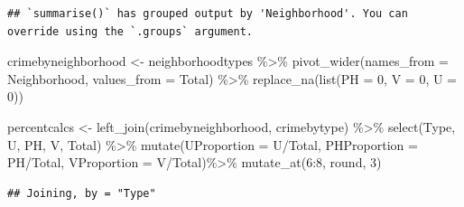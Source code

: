 \documentclass[
]{article}
\newenvironment{Shaded}{\begin{snugshade}}{\end{snugshade}}
\newcommand{\AttributeTok}[1]{\textcolor[rgb]{0.77,0.63,0.00}{#1}}
\newcommand{\DecValTok}[1]{\textcolor[rgb]{0.00,0.00,0.81}{#1}}
\newcommand{\FunctionTok}[1]{\textcolor[rgb]{0.00,0.00,0.00}{#1}}
\newcommand{\NormalTok}[1]{#1}
\newcommand{\OtherTok}[1]{\textcolor[rgb]{0.56,0.35,0.01}{#1}}
\newcommand{\SpecialCharTok}[1]{\textcolor[rgb]{0.00,0.00,0.00}{#1}}
\begin{document}
\begin{verbatim}
## `summarise()` has grouped output by 'Neighborhood'. You can override using the `.groups` argument.
\end{verbatim}

\begin{Shaded}
\begin{Highlighting}[]
\NormalTok{crimebyneighborhood }\OtherTok{\textless{}{-}}\NormalTok{ neighborhoodtypes }\SpecialCharTok{\%\textgreater{}\%}
  \FunctionTok{pivot\_wider}\NormalTok{(}\AttributeTok{names\_from =}\NormalTok{ Neighborhood, }\AttributeTok{values\_from =}\NormalTok{ Total) }\SpecialCharTok{\%\textgreater{}\%}
 \FunctionTok{replace\_na}\NormalTok{(}\FunctionTok{list}\NormalTok{(}\AttributeTok{PH =} \DecValTok{0}\NormalTok{, }\AttributeTok{V =} \DecValTok{0}\NormalTok{, }\AttributeTok{U =} \DecValTok{0}\NormalTok{))}

\NormalTok{percentcalcs }\OtherTok{\textless{}{-}} \FunctionTok{left\_join}\NormalTok{(crimebyneighborhood, crimebytype) }\SpecialCharTok{\%\textgreater{}\%}
  \FunctionTok{select}\NormalTok{(Type, U, PH, V, Total) }\SpecialCharTok{\%\textgreater{}\%}
  \FunctionTok{mutate}\NormalTok{(}\AttributeTok{UProportion =}\NormalTok{ U}\SpecialCharTok{/}\NormalTok{Total,}
         \AttributeTok{PHProportion =}\NormalTok{ PH}\SpecialCharTok{/}\NormalTok{Total,}
         \AttributeTok{VProportion =}\NormalTok{ V}\SpecialCharTok{/}\NormalTok{Total)}\SpecialCharTok{\%\textgreater{}\%}
  \FunctionTok{mutate\_at}\NormalTok{(}\DecValTok{6}\SpecialCharTok{:}\DecValTok{8}\NormalTok{, round, }\DecValTok{3}\NormalTok{)}
\end{Highlighting}
\end{Shaded}

\begin{verbatim}
## Joining, by = "Type"
\end{verbatim}
\end{document}
